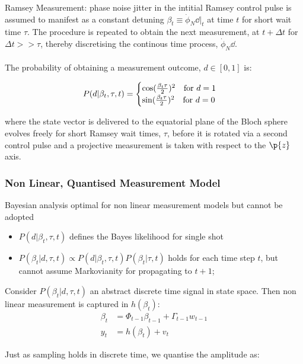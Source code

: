 Ramsey Measurement: phase noise jitter in the intitial Ramsey control pulse is assumed to manifest as a constant detuning $ \beta_t \equiv  \dot{\phi}_N\dd |_t$ at time $t$ for short wait time $\tau$. The procedure is repeated to obtain the next measurement, at $t + \Delta t$ for $\Delta t >> \tau$, thereby discretising the continous time process, $\dot{\phi}_N\dd$. 
\\
\\
The probability of obtaining a measurement outcome, $d \in [0,1]$ is:

\begin{align}
P(d | \beta_t, \tau, t) = \begin{cases} \cos(\frac{\beta_t \tau}{2})^2 \quad \text{for $d=1$} \\   \sin(\frac{\beta_t \tau}{2})^2  \quad \text{for $ d=0$} \end{cases}
\end{align}

where the state vector is delivered to the equatorial plane of the Bloch sphere evolves freely for short Ramsey wait times, $\tau$, before it is rotated via a second control pulse and a projective measurement is taken with respect to the $\p{z}$ axis.

\subsubsection{Non Linear, Quantised Measurement Model}

Bayesian analysis optimal for non linear measurement models but cannot be adopted 
\begin{itemize}
\item $P(d | \beta_t, \tau, t)$ defines the Bayes likelihood for single shot
\item $P(\beta_t| d, \tau, t)  \propto P(d | \beta_t, \tau, t) P(\beta_t| \tau, t)$ holds for each time step $t$, but cannot assume Markovianity for propagating to $t+1$;  
\end{itemize}

Consider $P(\beta_t| d, \tau, t)$ an abstract discrete time signal in state space. Then non linear measurement is captured in $ h(\beta_t)$:
\begin{align}
\beta_t &= \Phi_{t-1} \beta_{t-1} + \Gamma_{t-1} w_{t-1} \\
y_t &= h(\beta_t) + v_t 
\end{align}

Just as sampling holds in discrete time, we quantise the amplitude as:

